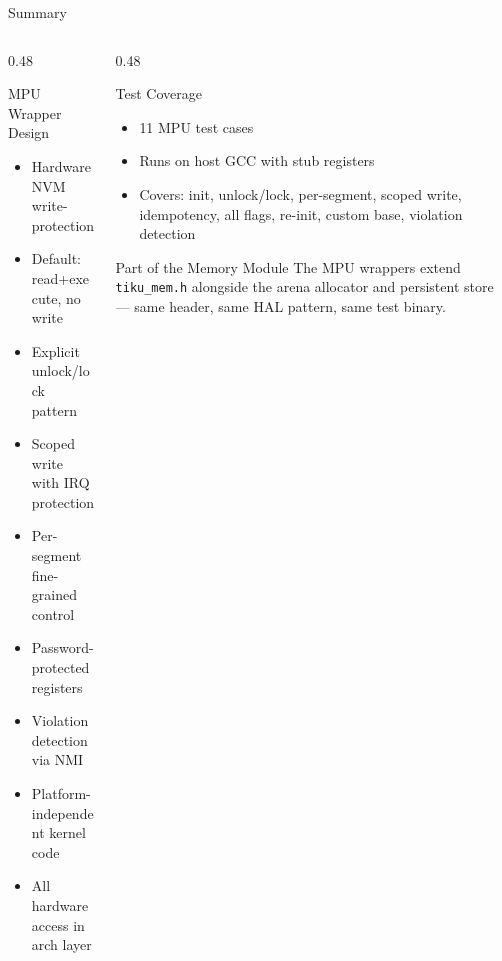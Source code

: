 \documentclass[aspectratio=169, 10pt]{beamer}
\begin{document}
\begin{frame}{Summary}
\begin{columns}[T]
\begin{column}{0.48\textwidth}
\begin{block}{MPU Wrapper Design}
\begin{itemize}
  \item Hardware NVM write-protection
  \item Default: read+execute, no write
  \item Explicit unlock/lock pattern
  \item Scoped write with IRQ protection
  \item Per-segment fine-grained control
  \item Password-protected registers
  \item Violation detection via NMI
  \item Platform-independent kernel code
  \item All hardware access in arch layer
\end{itemize}
\end{block}
\end{column}

\begin{column}{0.48\textwidth}
\begin{block}{Test Coverage}
\begin{itemize}
  \item 11 MPU test cases
  \item Runs on host GCC with stub registers
  \item Covers: init, unlock/lock, per-segment,
        scoped write, idempotency, all flags,
        re-init, custom base, violation detection
\end{itemize}
\end{block}

\vspace{0.3em}
\begin{alertblock}{Part of the Memory Module}
The MPU wrappers extend \texttt{tiku\_mem.h} alongside the arena
allocator and persistent store --- same header, same HAL pattern,
same test binary.
\end{alertblock}
\end{column}
\end{columns}
\end{frame}
\end{document}
